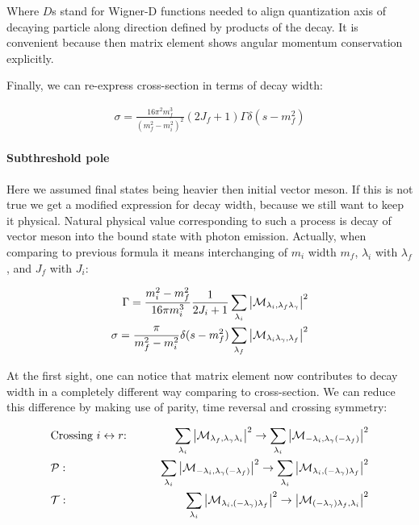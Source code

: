 Where $D$s stand for Wigner-D functions needed to align quantization axis of decaying particle along direction defined by products of the decay. It is convenient because then matrix element shows angular momentum conservation explicitly.

Finally, we can re-express cross-section in terms of decay width:

\begin{align} \label{eq:app:crsc-dw}
    \sigma = \frac{16 \pi^2 m_f^3}{(m_f^2 - m_i^2)^2} (2J_f + 1) \Gamma \delta(s - m_f^2)
\end{align}

\paragraph{Subthreshold pole} Here we assumed final states being heavier then initial vector meson. If this is not true we get a modified expression for decay width, because we still want to keep it physical. Natural physical value corresponding to such a process is decay of vector meson into the bound state with photon emission. Actually, when comparing to previous formula it means interchanging of $m_i$ width $m_f$, $\lambda_i$ with $\lambda_f$, and $J_f$ with $J_i$:

\begin{align}
        \Gamma = \frac{m_i^2 - m_f^2}{16 \pi m_i^3} \frac{1}{2J_i + 1} \sum_{\lambda_i} \abs{\mathcal{M}_{\lambda_i, \lambda_f \lambda_\gamma}}^2 \\
        \sigma = \frac{\pi}{m_f^2 - m_i^2} \delta(s - m_f^2) \sum_{\lambda_f} \abs{\mathcal{M}_{\lambda_i \lambda_\gamma, \lambda_f}}^2
\end{align}

At the first sight, one can notice that matrix element now contributes to decay width in a completely different way comparing to cross-section. We can reduce this difference by making use of parity, time reversal and crossing symmetry:

\begin{align}
    &\text{Crossing $i \leftrightarrow r$:}\qquad &\sum_{\lambda_i} \abs{\mathcal{M}_{\lambda_f, \lambda_\gamma \lambda_i}}^2 \rightarrow \sum_{\lambda_i} \abs{\mathcal{M}_{-\lambda_i, \lambda_\gamma (-\lambda_f)}}^2 \\
    &\mathcal{P}:\qquad &\sum_{\lambda_i} \abs{\mathcal{M}_{-\lambda_i, \lambda_\gamma (-\lambda_f)}}^2 \rightarrow \sum_{\lambda_i} \abs{\mathcal{M}_{\lambda_i, (-\lambda_\gamma) \lambda_f}}^2\\
    &\mathcal{T}:\qquad &\sum_{\lambda_i} \abs{\mathcal{M}_{\lambda_i, (-\lambda_\gamma) \lambda_f}}^2 \rightarrow \abs{\mathcal{M}_{(-\lambda_\gamma) \lambda_f, \lambda_i}}^2
\end{align}

